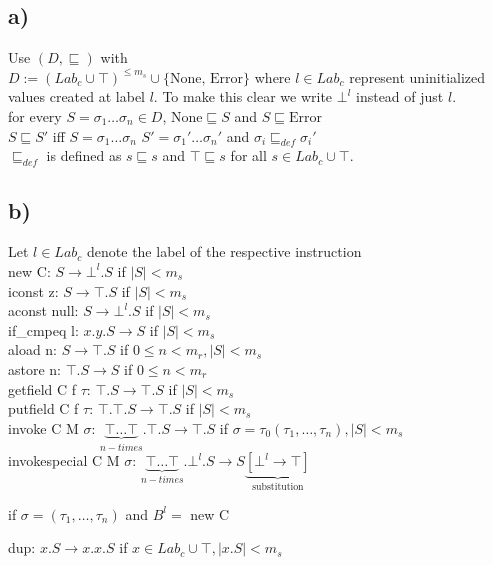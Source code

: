 \documentclass[fleqn,12pt]{article}
\begin{document}
\subsection*{a)}
Use $(D,\sqsubseteq)$ with\\
$D := (Lab_c \cup \top)^{\leq m_s} \cup \{\text{None, Error}\}$ where $l \in Lab_c$ represent uninitialized values created at label $l$. To make this clear we write $\bot^l$ instead of just $l$.\\

for every $S=\sigma_1\dots\sigma_n \in D$, $\text{None} \sqsubseteq S$ and $S \sqsubseteq \text{Error}$\\
$S \sqsubseteq S'$ iff $S=\sigma_1\dots\sigma_n$ $S'=\sigma_1'\dots\sigma_n'$ and $\sigma_i \sqsubseteq_{def} \sigma_i'$\\
$\sqsubseteq_{def}$ is defined as $s \sqsubseteq s$ and $\top \sqsubseteq s$ for all $s \in Lab_c \cup \top$.
\subsection*{b)}
Let $l \in Lab_c$ denote the label of the respective instruction\\

new C: $S \rightarrow \bot^l.S$ if $|S| < m_s$\\
iconst z: $S \rightarrow \top.S$ if $|S| < m_s$\\
aconst null: $S \rightarrow \bot^l.S$ if $|S| < m_s$\\
if\_cmpeq l: $x.y.S \rightarrow S$ if $|S| < m_s$\\
aload n: $S \rightarrow \top.S$ if $0\leq n < m_r, |S| < m_s$\\
astore n: $\top.S \rightarrow S$ if $0\leq n < m_r$\\
getfield C f $\tau$: $\top.S \rightarrow \top.S$ if $|S| < m_s$\\
putfield C f $\tau$: $\top.\top.S \rightarrow \top.S$ if $|S| < m_s$ \\
invoke C M $\sigma$: $\underbrace{\top\dots\top}_{n-times}.\top.S \rightarrow \top.S$ if $\sigma = \tau_0(\tau_1,\dots,\tau_n),|S| < m_s$\\
invokespecial C M $\sigma$: $\underbrace{\top\dots\top}_{n-times}.\bot^l.S \rightarrow S\underbrace{[\bot^l \rightarrow \top]}_{\text{substitution}}$ 
\begin{flushright}
if $\sigma = (\tau_1,\dots,\tau_n)$ and $B^l =$ new C
\end{flushright}
dup: $x.S \rightarrow x.x.S$ if $x \in Lab_c \cup \top, |x.S| < m_s$\\
\end{document}
